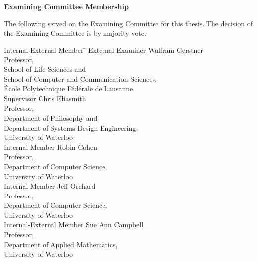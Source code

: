 \begin{center}\textbf{Examining Committee Membership}\end{center}

  \bigskip

  \noindent
The following served on the Examining Committee for this thesis. The decision of the Examining Committee is by majority vote.
  \bigskip
  
  \noindent
\begin{tabbing}
Internal-External Member \quad \=  \kill %
External Examiner \>  Wulfram Gerstner \\ 
\> Professor, \\
\> School of Life Sciences and\\
\> School of Computer and Communication Sciences, \\
\> École Polytechnique Fédérale de Lausanne\\[0.75cm]
Supervisor \> Chris Eliasmith \\
\> Professor, \\
\> Department of Philosophy and \\
\> Department of Systems Design Engineering, \\
\> University of Waterloo \\[0.75cm]
Internal Member \> Robin Cohen \\
\> Professor, \\
\> Department of Computer Science, \\
\> University of Waterloo \\[0.5cm]
Internal Member \> Jeff Orchard \\
\> Professor, \\
\> Department of Computer Science, \\
\> University of Waterloo \\[0.5cm]
Internal-External Member \> Sue Ann Campbell \\
\> Professor, \\
\> Department of Applied Mathematics, \\
\> University of Waterloo
\end{tabbing}

\clearpage
